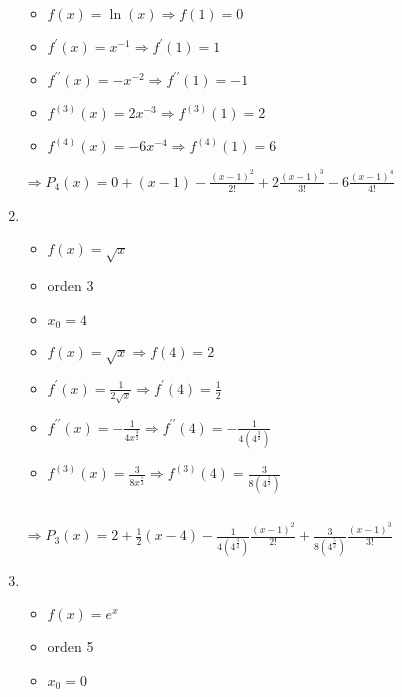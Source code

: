 \documentclass[../practica_05.tex]{subfiles}
\begin{document}
\begin{enumerate}
            \begin{itemize}
                \item $f(x) = \ln(x) \Rightarrow f(1) = 0$
                \item $f^\prime(x) = x^{-1} \Rightarrow f^\prime(1) = 1$
                \item $f^{\prime\prime}(x) = -x^{-2} \Rightarrow f^{\prime\prime}(1) = -1$
                \item $f^{(3)}(x) = 2x^{-3} \Rightarrow f^{(3)}(1) = 2$
                \item $f^{(4)}(x) = -6x^{-4} \Rightarrow f^{(4)}(1) = 6$
            \end{itemize}

            $\Rightarrow P_4(x) = 0 + (x-1) - \frac{(x-1)^2}{2!} + 2\frac{(x-1)^3}{3!} - 6\frac{(x-1)^4}{4!}$

        \item
            \begin{itemize}
                \item $f(x) = \sqrt{x}$
                \item orden 3
                \item $x_0 = 4$
            \end{itemize}

            \begin{itemize}
                \item $f(x) = \sqrt{x} \Rightarrow f(4) = 2$
                \item $f^\prime(x) = \frac{1}{2\sqrt{x}} \Rightarrow f^\prime(4) = \frac{1}{2}$
                \item $f^{\prime\prime}(x) = -\frac{1}{4x^{\frac{3}{2}}} \Rightarrow f^{\prime\prime}(4) = -\frac{1}{4(4^{\frac{3}{2}})}$
                \item $f^{(3)}(x) = \frac{3}{8x^{\frac{5}{2}}} \Rightarrow f^{(3)}(4) = \frac{3}{8(4^{\frac{5}{2}})}$
            \end{itemize}

            $ $

            $\Rightarrow P_3(x) = 2 + \frac{1}{2}(x-4) - \frac{1}{4(4^{\frac{3}{2}})}\frac{(x-1)^2}{2!} + \frac{3}{8(4^{\frac{5}{2}})}\frac{(x-1)^3}{3!}$

        \item
            \begin{itemize}
                \item $f(x) = e^x$
                \item orden 5
                \item $x_0 = 0$
            \end{itemize}


\end{enumerate}
\end{document}

